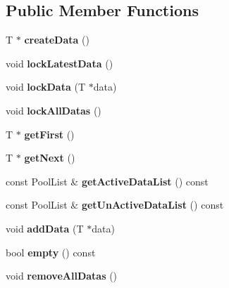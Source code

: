\subsection*{Public Member Functions}
\begin{DoxyCompactItemize}
\item 
\mbox{\label{classDataPool_a737acdb580cdb34ea8a59f76e094b490}} 
T $\ast$ {\bfseries create\+Data} ()
\item 
\mbox{\label{classDataPool_a2bd98736cebb5674f994ff04e70f908e}} 
void {\bfseries lock\+Latest\+Data} ()
\item 
\mbox{\label{classDataPool_ac508d992311e1302a3fe32ae9f3ae148}} 
void {\bfseries lock\+Data} (T $\ast$data)
\item 
\mbox{\label{classDataPool_acf14f62428a0ea0489732aef4d5fda9f}} 
void {\bfseries lock\+All\+Datas} ()
\item 
\mbox{\label{classDataPool_a85ffc7c859d87a285a6aa8742a864bd6}} 
T $\ast$ {\bfseries get\+First} ()
\item 
\mbox{\label{classDataPool_a629892c97006f0e415d6f13e052aadb7}} 
T $\ast$ {\bfseries get\+Next} ()
\item 
\mbox{\label{classDataPool_a352b216c91d7689b7a294d4071e815b8}} 
const Pool\+List \& {\bfseries get\+Active\+Data\+List} () const
\item 
\mbox{\label{classDataPool_ac4aa7bb314d777a1a180a4bf296d3545}} 
const Pool\+List \& {\bfseries get\+Un\+Active\+Data\+List} () const
\item 
\mbox{\label{classDataPool_aa59be4aff07116e60e4dff289e799562}} 
void {\bfseries add\+Data} (T $\ast$data)
\item 
\mbox{\label{classDataPool_a3ffa15675f08636bc320b5dbc1617f7c}} 
bool {\bfseries empty} () const
\item 
\mbox{\label{classDataPool_ae485b84a5b8a57d960948af4d0507d05}} 
void {\bfseries remove\+All\+Datas} ()

\end{DoxyCompactItemize}
